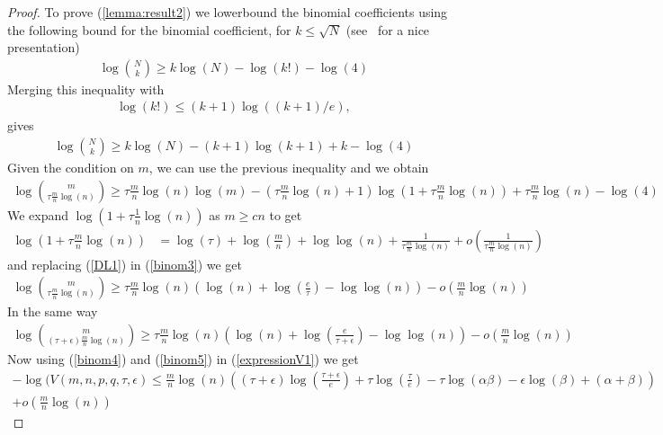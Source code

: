 \documentclass[english]{article}
\newcommand{\1}{\textbf{1}}
\begin{document}
\begin{proof}
To prove (\ref{lemma:result2}) we lowerbound the binomial coefficients using the following bound for the binomial coefficient, for $k\leq \sqrt{N}$ (see~\cite{blog:binomial} for a nice presentation) 
\begin{align}
\log \binom{N}{k} \geq k \log(N) -\log(k!) -\log(4)
\end{align}
Merging this inequality with
\begin{align}
\log(k!)\leq (k+1)\log((k+1)/e),
\end{align}
gives
\begin{align}
\log \binom{N}{k} \geq k \log(N) -(k+1)\log(k+1)+k -\log(4)
\end{align}
Given the condition on $m$, we can use the previous inequality and we obtain
\begin{align} \label{binom3}
\log \binom{m}{\tau \frac{m}{n} \log(n)} \geq \tau \frac{m}{n} \log(n) \log(m) - \left(\tau \frac{m}{n} \log(n) +1\right) \log \left( 1+ \tau \frac{m}{n} \log(n) \right) +\tau \frac{m}{n} \log(n) -\log(4)
\end{align}
We expand $\log(1+\tau \frac{1}{n} \log(n))$ as $m\geq c n$ to get
\begin{align} \label{DL1}
\log(1+\tau \frac{m}{n} \log(n)) &=\log(\tau) +\log \left( \frac{m}{n}\right) + \log \log(n) +\frac{1}{\tau \frac{m}{n} \log(n)}+ o\left( \frac{1}{\tau \frac{m}{n} \log(n)} \right)
\end{align}
and replacing (\ref{DL1}) in (\ref{binom3}) we get 
\begin{align} \label{binom4}
\log \binom{m}{\tau \frac{m}{n} \log(n)} \geq \tau \frac{m}{n} \log(n) \left( \log(n)+\log \left( \frac{e}{\tau}\right) -\log \log(n) \right) - o \left( \frac{m}{n} \log(n) \right) 
\end{align}
In the same way
\begin{align} \label{binom5}
\log \binom{m}{(\tau+\epsilon) \frac{m}{n} \log(n)} \geq \tau \frac{m}{n} \log(n) \left( \log(n)+\log \left( \frac{e}{\tau+\epsilon}\right) -\log \log(n) \right) - o \left( \frac{m}{n} \log(n) \right) 
\end{align}
Now using (\ref{binom4}) and (\ref{binom5}) in (\ref{expressionV1}) we get
\begin{align} \label{expressionV3}
-\log(V(m,n,p,q,\tau, \epsilon) \leq \frac{m}{n} \log(n) \left( (\tau +\epsilon) \log \left( \frac{\tau +\epsilon}{e}\right) +\tau \log \left( \frac{\tau}{e}\right) - \tau \log(\alpha \beta) -\epsilon \log(\beta) +(\alpha +\beta) \right)\\
 + o \left( \frac{m}{n}\log(n) \right) \nonumber
\end{align}


\end{proof}
\end{document}
